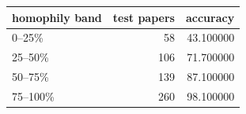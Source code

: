 \begin{tabular}{lrr}
\toprule
homophily band & test papers & accuracy \\
\midrule
0–25\% & 58 & 43.100000 \\
25–50\% & 106 & 71.700000 \\
50–75\% & 139 & 87.100000 \\
75–100\% & 260 & 98.100000 \\
\bottomrule
\end{tabular}
